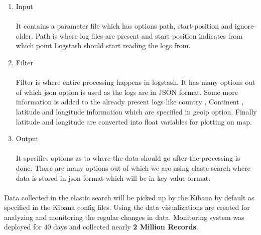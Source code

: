 \documentclass{report}
\begin{document}
\begin{enumerate}
\item Input
\paragraph{}
It contains a parameter file which has options path, start-position and ignore-older. Path is where log files are present and start-position indicates from which point Logstash should start reading the logs from.
\item Filter
\paragraph{}
Filter is where entire processing happens in logstash. It has many options out of which json option is used as the logs are in JSON format. Some more information is added to the already present logs like country , Continent , latitude and longitude information which are specified in geoip option. Finally latitude and longitude are converted into float variables for plotting on map.
\item Output
\paragraph{}
It specifies options as to where the data should go after the processing is done. There are many options out of which we are using elastc search where data is stored in json format which will be in key value format.
\end{enumerate}

\paragraph{}
Data collected in the elastic search will be picked up by the Kibana by default as specified in the Kibana config files. Using the data visualizations are created for analyzing and monitoring the regular changes in data. Monitoring system was deployed for 40 days and collected nearly \textbf{2 Million Records}.
\end{document}
